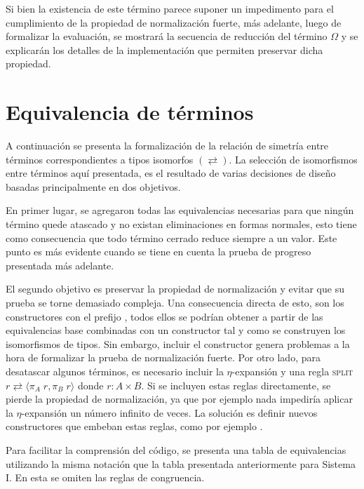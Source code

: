 Si bien la existencia de este término parece suponer un impedimento para el cumplimiento de la propiedad de normalización fuerte, más adelante, luego de formalizar la evaluación, se mostrará la secuencia de reducción del término $\Omega$ y se explicarán los detalles de la implementación que permiten preservar dicha propiedad.

\section{Equivalencia de términos}

A continuación se presenta la formalización de la relación de simetría entre términos correspondientes a tipos isomorfos $(\rightleftarrows)$.
La selección de isomorfismos entre términos aquí presentada, es el resultado de varias decisiones de diseño basadas principalmente en dos objetivos.

En primer lugar, se agregaron todas las equivalencias necesarias para que ningún término quede atascado y no existan eliminaciones en formas normales, esto tiene como consecuencia que todo término cerrado reduce siempre a un valor.
Este punto es más evidente cuando se tiene en cuenta la prueba de progreso presentada más adelante.

El segundo objetivo es preservar la propiedad de normalización y evitar que su prueba se torne demasiado compleja.
Una consecuencia directa de esto, son los constructores con el prefijo , todos ellos se podrían obtener a partir de las equivalencias base combinadas con un constructor  tal y como se construyen los isomorfismos de tipos.
Sin embargo, incluir el constructor  genera problemas a la hora de formalizar la prueba de normalización fuerte.
Por otro lado, para desatascar algunos términos, es necesario incluir la $\eta$-expansión y una regla \textsc{split} $r \rightleftarrows \langle \pi_A\; r , \pi_B\; r \rangle$ donde $r: A \times B$.
Si se incluyen estas reglas directamente, se pierde la propiedad de normalización, ya que por ejemplo nada impediría aplicar la $\eta$-expansión un número infinito de veces.
La solución es definir nuevos constructores que embeban estas reglas, como por ejemplo .

Para facilitar la comprensión del código, se presenta una tabla de equivalencias utilizando la misma notación que la tabla presentada anteriormente para Sistema I.
En esta se omiten las reglas de congruencia.

